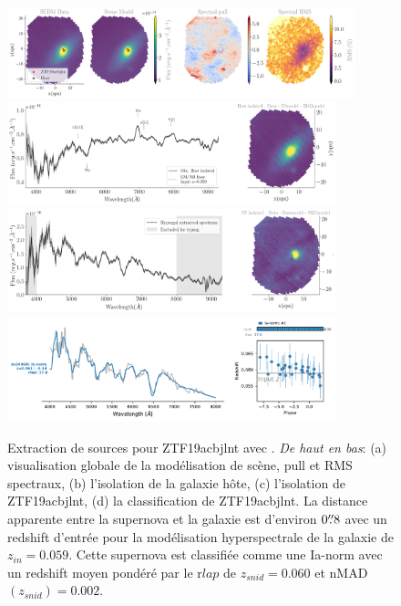 \documentclass[../main/main.tex]{subfiles}
\begin{document}
\begin{figure}[ht]
  \centering
  \includegraphics[width=0.9\textwidth]{../figures/07_scene/scene_rmspull_ZTF19acbjlnt.png}
  \includegraphics[width=0.85\textwidth]{../figures/07_scene/output_host_ZTF19acbjlnt.png}
  \includegraphics[width=0.85\textwidth]{../figures/07_scene/output_target_ZTF19acbjlnt.png}
  \includegraphics[width=0.85\textwidth]{../figures/07_scene/ZTF19acbjlnt_snid_typing.pdf}
  \caption[Extraction de sources pour ZTF19acbjlnt.]{Extraction de
    sources pour ZTF19acbjlnt avec \hypergal. \emph{De haut en bas}:
    (a) visualisation globale de la modélisation de scène, pull et RMS
    spectraux, (b) l'isolation de la galaxie hôte, (c) l'isolation de
    ZTF19acbjlnt, (d) la classification  de ZTF19acbjlnt. La distance apparente entre la
supernova et la galaxie est d'environ $0\overset{\prime\prime}{.}8$ avec un redshift
d'entrée pour la modélisation hyperspectrale de la galaxie de $z_{in}=0.059$. Cette supernova est classifiée comme une Ia-norm
avec un redshift moyen pondéré par le r$lap$ de $z_{snid}=0.060$ et
nMAD$(z_{snid})=0.002$.}
  \label{fig:ZTF19acbjlnt}
\end{figure}
\end{document}

